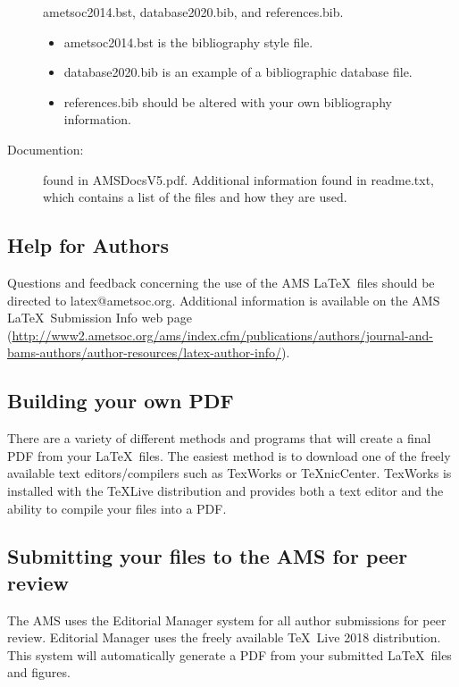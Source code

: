 \documentclass{ametsocV5}
\begin{document}
\begin{description}
ametsoc2014.bst, database2020.bib, and references.bib.  

\begin{itemize}
\item
ametsoc2014.bst is the bibliography style file. 

\item
database2020.bib is an example of a bibliographic database file.

\item
references.bib should be altered with your own bibliography information.  
\end{itemize}



\item[Documention:] found in AMSDocsV5.pdf. Additional information
found in
readme.txt, which contains a list of the files and how they are used.

\end{description}

\subsection{Help for Authors}
Questions and feedback concerning the use of the AMS \LaTeX\ files should be
directed to latex@ametsoc.org. Additional information is available on the AMS
\LaTeX\ Submission Info web page (\url{http://www2.ametsoc.org/ams/index.cfm/publications/authors/journal-and-bams-authors/author-resources/latex-author-info/}).



\appendix[C]

\subsection{Building your own PDF}
There are a variety of different methods and programs that will create a
final PDF from your \LaTeX\ files. The easiest method is to download one of
the freely available text editors/compilers such as TexWorks or TeXnicCenter.
TexWorks is installed with the TeXLive distribution and provides both a text
editor and the ability to compile your files into a PDF.

\subsection{Submitting your files to the AMS for peer review}
The AMS uses the Editorial Manager system for all author submissions for
peer review. Editorial Manager uses the freely available \TeX\ Live 2018
distribution. This system will automatically generate a PDF from your
submitted \LaTeX\ files and figures.  
\end{document}
